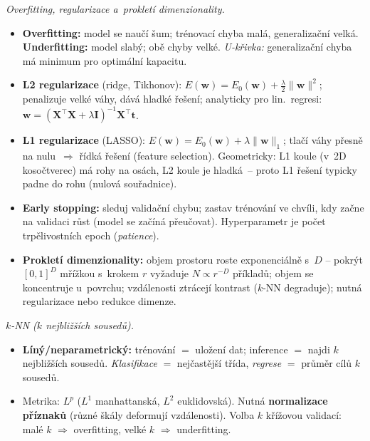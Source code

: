 \begin{poznamka}
\smallskip
\emph{Overfitting, regularizace a~prokletí dimenzionality.}
\begin{itemize}
  \item \textbf{Overfitting:} model se naučí šum; trénovací chyba malá, generalizační velká. \textbf{Underfitting:} model slabý; obě chyby velké. \emph{U-křivka:} generalizační chyba má minimum pro optimální kapacitu.
  \item \textbf{L2 regularizace} (ridge, Tikhonov): $E(\mathbf{w})=E_0(\mathbf{w})+\frac\lambda2\|\mathbf{w}\|^2$; penalizuje velké váhy, dává hladké řešení; analyticky pro lin.\ regresi: $\mathbf{w}=(\mathbf{X}^\top\mathbf{X}+\lambda\mathbf{I})^{-1}\mathbf{X}^\top\mathbf{t}$.
  \item \textbf{L1 regularizace} (LASSO): $E(\mathbf{w})=E_0(\mathbf{w})+\lambda\|\mathbf{w}\|_1$; tlačí váhy přesně na nulu~$\Rightarrow$ řídká řešení (feature selection). Geometricky: L1 koule (v~2D kosočtverec) má rohy na osách, L2 koule je hladká~-- proto L1 řešení typicky padne do rohu (nulová souřadnice).
  \item \textbf{Early stopping:} sleduj validační chybu; zastav trénování ve chvíli, kdy začne na validaci růst (model se začíná přeučovat). Hyperparametr je počet trpělivostních epoch (\textit{patience}).
  \item \textbf{Prokletí dimenzionality:} objem prostoru roste exponenciálně s~$D$ -- pokrýt $[0,1]^D$ mřížkou s~krokem $r$ vyžaduje $N\propto r^{-D}$ příkladů; objem se koncentruje u~povrchu; vzdálenosti ztrácejí kontrast ($k$-NN degraduje); nutná regularizace nebo redukce dimenze.
\end{itemize}

\smallskip
\emph{$k$-NN ($k$ nejbližších sousedů).}
\begin{itemize}
  \item \textbf{Líný/neparametrický:} trénování $=$ uložení dat; inference $=$ najdi $k$ nejbližších sousedů. \emph{Klasifikace} $=$ nejčastější třída, \emph{regrese} $=$ průměr cílů $k$ sousedů.
  \item Metrika: $L^p$ ($L^1$ manhattanská, $L^2$ euklidovská). Nutná \textbf{normalizace příznaků} (různé škály deformují vzdálenosti). Volba $k$ křížovou validací: malé $k$ $\Rightarrow$ overfitting, velké $k$ $\Rightarrow$ underfitting.
\end{itemize}


\end{poznamka}
